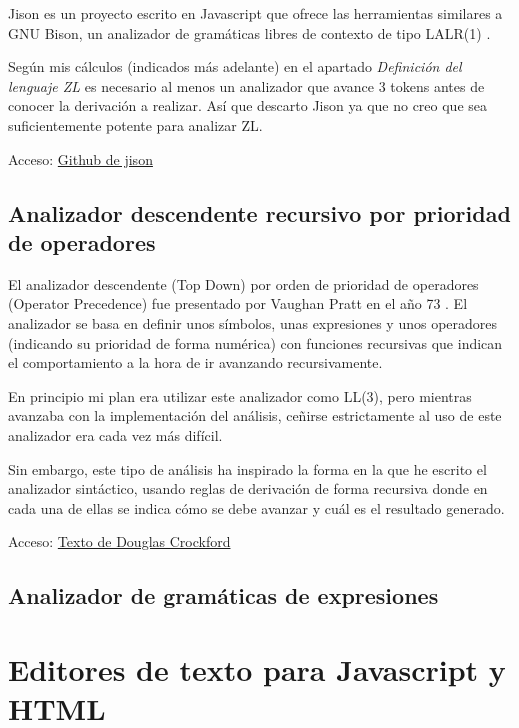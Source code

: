 \documentclass{report}
\begin{document}
	Jison es un proyecto escrito en Javascript que ofrece las herramientas similares a GNU Bison, un analizador de gramáticas libres de contexto de tipo LALR(1) \cite{bison}.
	
	Según mis cálculos (indicados más adelante) en el apartado \textit{Definición del lenguaje ZL} es necesario al menos un analizador que avance 3 tokens antes de conocer la derivación a realizar. Así que descarto Jison ya que no creo que sea suficientemente potente para analizar ZL. 
	
	Acceso:
	\href{https://github.com/zaach/jison}{Github de jison}	
	
	\subsection{Analizador descendente recursivo por prioridad de operadores}
	
	El analizador descendente (Top Down) por orden de prioridad de operadores (Operator Precedence) fue presentado por Vaughan Pratt en el año 73 \cite{acmtdop}. El analizador se basa en definir unos símbolos, unas expresiones y unos operadores (indicando su prioridad de forma numérica) con funciones recursivas que indican el comportamiento a la hora de ir avanzando recursivamente.
	
	
	En principio mi plan era utilizar este analizador como LL(3), pero mientras avanzaba con la implementación del análisis, ceñirse estrictamente al uso de este analizador era cada vez más difícil. 
	
	Sin embargo, este tipo de análisis ha inspirado la forma en la que he escrito el analizador sintáctico, usando reglas de derivación de forma recursiva donde en cada una de ellas se indica
	cómo se debe avanzar y cuál es el resultado generado. 
	
	Acceso:
	\href{http://javascript.crockford.com/tdop/tdop.html}{Texto de Douglas Crockford}
	
	\subsection{Analizador de gramáticas de expresiones}
	
	
	\section{Editores de texto para Javascript y HTML}
	
\end{document}
